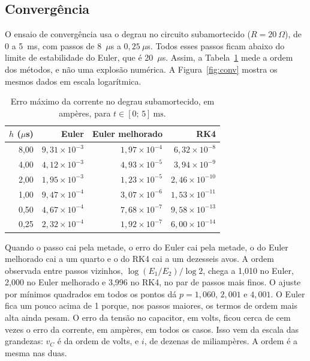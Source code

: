 \subsection{Convergência}
\label{sec:convergencia}

O ensaio de convergência usa o degrau no circuito subamortecido (\(R=20~\Omega\)), de 0 a 5~ms, com passos de 8~\(\mu\)s a \(0{,}25~\mu\)s. Todos esses passos ficam abaixo do limite de estabilidade do Euler, que é 20~\(\mu\)s. Assim, a Tabela~\ref{tab:conv} mede a ordem dos métodos, e não uma explosão numérica. A Figura~\ref{fig:conv} mostra os mesmos dados em escala logarítmica.

\begin{table}[htbp]
\centering
\caption{Erro máximo da corrente no degrau subamortecido, em ampères, para \(t\in[0;\,5]~\mathrm{ms}\).}
\label{tab:conv}
\small
\begin{tabular}{@{}rrrr@{}}
\toprule
\(h\) (\(\mu\)s) & Euler & Euler melhorado & RK4 \\
\midrule
8{,}00 & \(9{,}31\times 10^{-3}\) & \(1{,}97\times 10^{-4}\) & \(6{,}32\times 10^{-8}\) \\
4{,}00 & \(4{,}12\times 10^{-3}\) & \(4{,}93\times 10^{-5}\) & \(3{,}94\times 10^{-9}\) \\
2{,}00 & \(1{,}95\times 10^{-3}\) & \(1{,}23\times 10^{-5}\) & \(2{,}46\times 10^{-10}\) \\
1{,}00 & \(9{,}47\times 10^{-4}\) & \(3{,}07\times 10^{-6}\) & \(1{,}53\times 10^{-11}\) \\
0{,}50 & \(4{,}67\times 10^{-4}\) & \(7{,}68\times 10^{-7}\) & \(9{,}58\times 10^{-13}\) \\
0{,}25 & \(2{,}32\times 10^{-4}\) & \(1{,}92\times 10^{-7}\) & \(6{,}00\times 10^{-14}\) \\
\bottomrule
\end{tabular}
\end{table}

Quando o passo cai pela metade, o erro do Euler cai pela metade, o do Euler melhorado cai a um quarto e o do RK4 cai a um dezesseis avos. A ordem observada entre passos vizinhos, \(\log(E_1/E_2)/\log 2\), chega a 1,010 no Euler, 2,000 no Euler melhorado e 3,996 no RK4, no par de passos mais finos. O ajuste por mínimos quadrados em todos os pontos dá \(p=1{,}060\), \(2{,}001\) e \(4{,}001\). O Euler fica um pouco acima de 1 porque, nos passos maiores, os termos de ordem mais alta ainda pesam. O erro da tensão no capacitor, em volts, ficou cerca de cem vezes o erro da corrente, em ampères, em todos os casos. Isso vem da escala das grandezas: \(v_C\) é da ordem de volts, e \(i\), de dezenas de miliampères. A ordem é a mesma nas duas.

